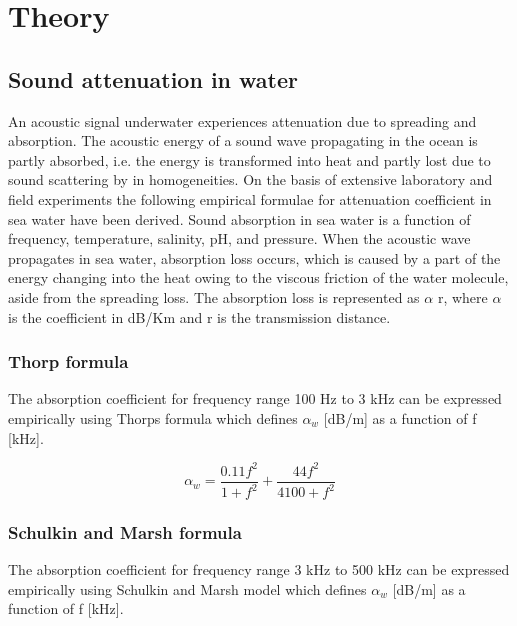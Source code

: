 \chapter{Theory} \label{Theory}

\section{ Sound attenuation in water } \label{ Sound attenuation in water }

\noindent An acoustic signal underwater experiences attenuation due to spreading and absorption. The acoustic energy of a sound wave propagating in the ocean is partly absorbed, i.e. the energy is transformed into heat and partly lost due to sound scattering by in homogeneities. On the basis of extensive laboratory and field experiments the following empirical formulae for attenuation coefficient in sea water have been derived. Sound absorption in sea water is a function of frequency, temperature, salinity, pH, and pressure. When the acoustic wave propagates in sea water, absorption loss occurs, which is caused by a part of the energy changing into the heat owing to the viscous friction of the water molecule, aside from the spreading loss. The absorption loss is represented as $\alpha$ r, where  $\alpha$ is the coefficient in dB/Km  and r is the transmission distance.

\subsection{ Thorp formula } \label{ Thorp formula }

\noindent The absorption coefficient for frequency range 100 Hz to 3 kHz can be expressed empirically using Thorps formula which defines $\alpha_w$ [dB/m] as a function of f [kHz].

\[ \alpha_w  = \frac{0.11 f^2}{1 + f^2} + \frac{44 f^2}{4100 + f^2} \] 

\subsection{ Schulkin and Marsh formula } \label{ Schulkin and Marsh formula }

\noindent The absorption coefficient for frequency range 3 kHz to 500 kHz can be expressed empirically using Schulkin and Marsh model which defines  $\alpha_w$ [dB/m] as a function of f [kHz].

